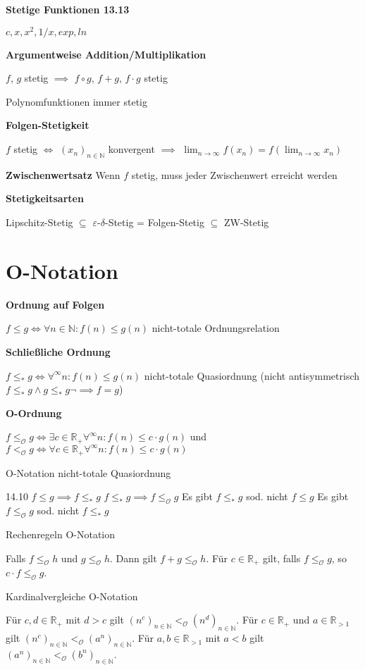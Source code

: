 \documentclass[a4paper,10pt]{article}
\newcommand{\N}{\mathbb{N}}
\newcommand{\natnum}{\mathbb{N}}
\newcommand{\realnum}{\mathbb{R}}
\newcommand{\lt}{<}
\newcommand{\gt}{>}
\renewcommand{\epsilon}{\varepsilon}
\newcommand{\bigOSymbol}{\mathcal{O}}
\begin{document}
\begin{multicols}{3}
\textbf{Stetige Funktionen 13.13}

$c, x, x^2, 1/x, exp, ln$

\textbf{Argumentweise Addition/Multiplikation}

$f$, $g$ stetig $\implies$ $f \circ g$, $f+g$, $f\cdot g$ stetig

Polynomfunktionen immer stetig

\textbf{Folgen-Stetigkeit}

$f$ stetig $\iff$ $(x_n)_{n\in\N}$ konvergent $\implies$ $\lim_{n \rightarrow \infty} f(x_n) = f\left(\lim_{n \rightarrow \infty} x_n \right)$

\textbf{Zwischenwertsatz} Wenn $f$ stetig, muss jeder Zwischenwert erreicht werden

\textbf{Stetigkeitsarten}

Lipschitz-Stetig $\subseteq$ $\epsilon$-$\delta$-Stetig = Folgen-Stetig $\subseteq$ ZW-Stetig 

\section{O-Notation}

\textbf{Ordnung auf Folgen}

$f \leq g \Leftrightarrow \forall n \in \natnum: f(n) \leq g(n)$ nicht-totale Ordnungsrelation

\textbf{Schließliche Ordnung}

$f \leq_* g \Leftrightarrow \forall^\infty n: f(n) \leq g(n)$ nicht-totale Quasiordnung (nicht antisymmetrisch $f\leq_* g \land g \leq_* g \neg\implies f=g$)

\textbf{O-Ordnung}

$f \leq_{\bigOSymbol} g \Leftrightarrow \exists c \in \realnum_+ \forall^\infty n: f(n) \leq c \cdot g(n)$ und $f \lt_{\bigOSymbol} g \Leftrightarrow \forall c \in \realnum_+ \forall^\infty n: f(n) \leq c \cdot g(n)$

O-Notation nicht-totale Quasiordnung

14.10
$f \leq g \implies f \leq_* g$
$f \leq_* g \implies f \leq_{\bigOSymbol} g$
Es gibt $f \leq_* g$ sod. nicht $f \leq g$
Es gibt $f \leq_{\bigOSymbol} g$ sod. nicht $f \leq_* g$

Rechenregeln O-Notation

Falls $f \leq_{\bigOSymbol} h$ und $g \leq_{\bigOSymbol} h$. Dann gilt $f+g \leq_{\bigOSymbol} h$.
Für $c \in \realnum_+$ gilt, falls $f \leq_{\bigOSymbol} g$, so $c \cdot f \leq_{\bigOSymbol} g$.

Kardinalvergleiche O-Notation


Für $c,d \in \realnum_+$ mit $d \gt c$ gilt $\left(n^c\right)_{n \in \natnum} \lt_{\bigOSymbol} \left(n^d\right)_{n \in \natnum}$.
Für $c \in \realnum_+$ und $a \in \realnum_{\gt 1}$ gilt $\left(n^c\right)_{n \in \natnum} \lt_{\bigOSymbol} \left(a^n\right)_{n \in \natnum}$.
Für $a,b \in \realnum_{\gt 1}$ mit $a \lt b$ gilt $\left(a^n\right)_{n \in \natnum} \lt_{\bigOSymbol} \left(b^n\right)_{n \in \natnum}$.

\end{multicols}
\end{document}
